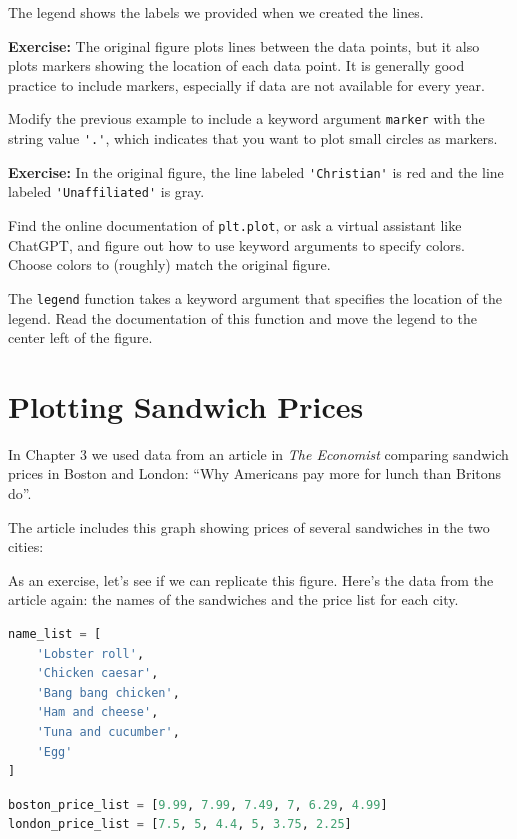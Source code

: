 The legend shows the labels we provided when we created the lines.

\textbf{Exercise:} The original figure plots lines between the data
points, but it also plots markers showing the location of each data
point. It is generally good practice to include markers, especially if
data are not available for every year.

Modify the previous example to include a keyword argument
\passthrough{\lstinline!marker!} with the string value
\passthrough{\lstinline!'.'!}, which indicates that you want to plot
small circles as markers.

\textbf{Exercise:} In the original figure, the line labeled
\passthrough{\lstinline!'Christian'!} is red and the line labeled
\passthrough{\lstinline!'Unaffiliated'!} is gray.

Find the online documentation of \passthrough{\lstinline!plt.plot!}, or
ask a virtual assistant like ChatGPT, and figure out how to use keyword
arguments to specify colors. Choose colors to (roughly) match the
original figure.

The \passthrough{\lstinline!legend!} function takes a keyword argument
that specifies the location of the legend. Read the documentation of
this function and move the legend to the center left of the figure.

\hypertarget{plotting-sandwich-prices}{%
\section{Plotting Sandwich Prices}\label{plotting-sandwich-prices}}

In Chapter 3 we used data from an article in \emph{The Economist}
comparing sandwich prices in Boston and London: ``Why Americans pay more
for lunch than Britons do''.

The article includes this graph showing prices of several sandwiches in
the two cities:

As an exercise, let's see if we can replicate this figure. Here's the
data from the article again: the names of the sandwiches and the price
list for each city.

\begin{lstlisting}[language=Python,style=source]
name_list = [
    'Lobster roll',
    'Chicken caesar',
    'Bang bang chicken',
    'Ham and cheese',
    'Tuna and cucumber',
    'Egg'
]
\end{lstlisting}

\begin{lstlisting}[language=Python,style=source]
boston_price_list = [9.99, 7.99, 7.49, 7, 6.29, 4.99]
london_price_list = [7.5, 5, 4.4, 5, 3.75, 2.25]
\end{lstlisting}


